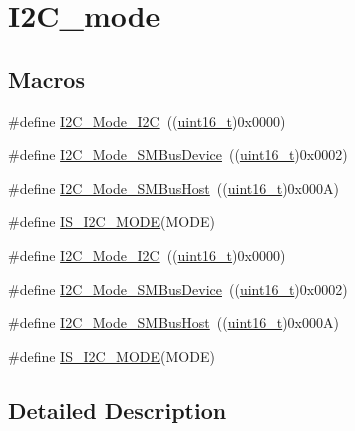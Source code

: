 \hypertarget{group___i2_c__mode}{}\section{I2\+C\+\_\+mode}
\label{group___i2_c__mode}
\subsection*{Macros}
\begin{DoxyCompactItemize}
\item 
\#define \hyperlink{group___i2_c__mode_ga8bc3b0555ca31b6f8423bc2ada45d1ac}{I2\+C\+\_\+\+Mode\+\_\+\+I2C}~((\hyperlink{_p_e___types_8h_a1f1825b69244eb3ad2c7165ddc99c956}{uint16\+\_\+t})0x0000)
\item 
\#define \hyperlink{group___i2_c__mode_gaf0cf66bc1f4986ba8a9925da924e06da}{I2\+C\+\_\+\+Mode\+\_\+\+S\+M\+Bus\+Device}~((\hyperlink{_p_e___types_8h_a1f1825b69244eb3ad2c7165ddc99c956}{uint16\+\_\+t})0x0002)
\item 
\#define \hyperlink{group___i2_c__mode_gacfd37619c8d91dea5dec2921840acede}{I2\+C\+\_\+\+Mode\+\_\+\+S\+M\+Bus\+Host}~((\hyperlink{_p_e___types_8h_a1f1825b69244eb3ad2c7165ddc99c956}{uint16\+\_\+t})0x000\+A)
\item 
\#define \hyperlink{group___i2_c__mode_ga58464e1fe94a79bab721137a544baf79}{I\+S\+\_\+\+I2\+C\+\_\+\+M\+O\+DE}(M\+O\+DE)
\item 
\#define \hyperlink{group___i2_c__mode_ga8bc3b0555ca31b6f8423bc2ada45d1ac}{I2\+C\+\_\+\+Mode\+\_\+\+I2C}~((\hyperlink{_p_e___types_8h_a1f1825b69244eb3ad2c7165ddc99c956}{uint16\+\_\+t})0x0000)
\item 
\#define \hyperlink{group___i2_c__mode_gaf0cf66bc1f4986ba8a9925da924e06da}{I2\+C\+\_\+\+Mode\+\_\+\+S\+M\+Bus\+Device}~((\hyperlink{_p_e___types_8h_a1f1825b69244eb3ad2c7165ddc99c956}{uint16\+\_\+t})0x0002)
\item 
\#define \hyperlink{group___i2_c__mode_gacfd37619c8d91dea5dec2921840acede}{I2\+C\+\_\+\+Mode\+\_\+\+S\+M\+Bus\+Host}~((\hyperlink{_p_e___types_8h_a1f1825b69244eb3ad2c7165ddc99c956}{uint16\+\_\+t})0x000\+A)
\item 
\#define \hyperlink{group___i2_c__mode_ga58464e1fe94a79bab721137a544baf79}{I\+S\+\_\+\+I2\+C\+\_\+\+M\+O\+DE}(M\+O\+DE)
\end{DoxyCompactItemize}


\subsection{Detailed Description}


